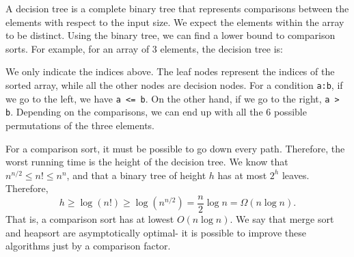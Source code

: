 \documentclass[a4paper, openany]{memoir}
\begin{document}
\noindent A decision tree is a complete binary tree that represents comparisons between the elements with respect to the input size. We expect the elements within the array to be distinct. Using the binary tree, we can find a lower bound to comparison sorts. For example, for an array of 3 elements, the decision tree is:
\begin{center}
\end{center}
We only indicate the indices above. The leaf nodes represent the indices of the sorted array, while all the other nodes are decision nodes. For a condition \texttt{a:b}, if we go to the left, we have \texttt{a <= b}. On the other hand, if we go to the right, \texttt{a > b}. Depending on the comparisons, we can end up with all the 6 possible permutations of the three elements. 

\noindent For a comparison sort, it must be possible to go down every path. Therefore, the worst running time is the height of the decision tree. We know that $n^{n/2} \leq n! \leq n^n$, and that a binary tree of height $h$ has at most $2^h$ leaves. Therefore,
\[h \geq \log (n!) \geq \log (n^{n/2}) = \frac{n}{2} \log n = \Omega(n \log n).\]
That is, a comparison sort has at lowest $O(n \log n)$. We say that merge sort and heapsort are asymptotically optimal- it is possible to improve these algorithms just by a comparison factor.
\end{document}
